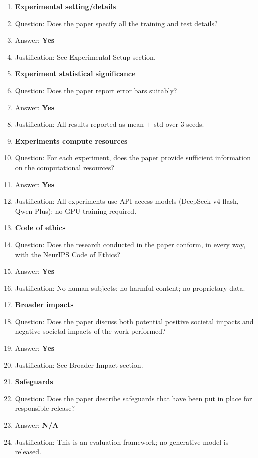 \documentclass{article}
\newcommand{\answerYes}[1][]{\textbf{Yes}}
\newcommand{\answerNA}[1][]{\textbf{N/A}}
\begin{document}
\begin{enumerate}
\item {\bf Experimental setting/details}
    \item[] Question: Does the paper specify all the training and test details?
    \item[] Answer: \answerYes{}
    \item[] Justification: See Experimental Setup section.

\item {\bf Experiment statistical significance}
    \item[] Question: Does the paper report error bars suitably?
    \item[] Answer: \answerYes{}
    \item[] Justification: All results reported as mean $\pm$ std over 3 seeds.

\item {\bf Experiments compute resources}
    \item[] Question: For each experiment, does the paper provide sufficient information on the computational resources?
    \item[] Answer: \answerYes{}
    \item[] Justification: All experiments use API-access models (DeepSeek-v4-flash, Qwen-Plus); no GPU training required.

\item {\bf Code of ethics}
    \item[] Question: Does the research conducted in the paper conform, in every way, with the NeurIPS Code of Ethics?
    \item[] Answer: \answerYes{}
    \item[] Justification: No human subjects; no harmful content; no proprietary data.

\item {\bf Broader impacts}
    \item[] Question: Does the paper discuss both potential positive societal impacts and negative societal impacts of the work performed?
    \item[] Answer: \answerYes{}
    \item[] Justification: See Broader Impact section.

\item {\bf Safeguards}
    \item[] Question: Does the paper describe safeguards that have been put in place for responsible release?
    \item[] Answer: \answerNA{}
    \item[] Justification: This is an evaluation framework; no generative model is released.


\end{enumerate}
\end{document}
